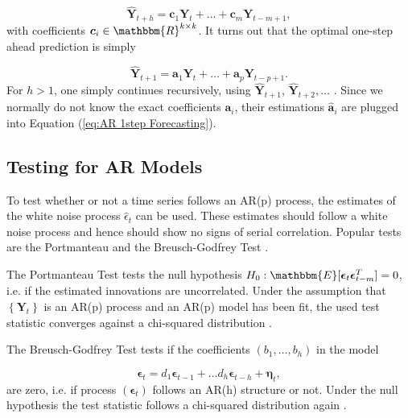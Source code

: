 \begin{equation}
\hat{\bm{Y}}_{t+h} = \bm{c}_1\bm{Y}_{t} + \ldots + \bm{c}_m\bm{Y}_{t-m+1},
\label{eq:Forecasting general}
\end{equation}
%
with coefficients $\bm{c}_i \in \mathbbm{R}^{k \times k}$. It turns out that the optimal one-step ahead prediction is simply \textcite{Scherrer:2021}

\begin{equation}
\hat{\bm{Y}}_{t+1} = \bm{a}_1\bm{Y}_{t} + \ldots + \bm{a}_p\bm{Y}_{t-p+1}.
\label{eq:AR 1step Forecasting}
\end{equation}
%
For $h>1$, one simply continues recursively, using $\hat{\bm{Y}}_{t+1}$, $\hat{\bm{Y}}_{t+2},\ldots$ \textcite{Scherrer:2021}. Since we normally do not know the exact coefficients $\bm{a}_i$, their estimations $\hat{\bm{a}}_i$ are plugged into Equation (\ref{eq:AR 1step Forecasting}). 

\subsection{Testing for AR Models}
\label{sec: Testing for ar models}

To test whether or not a time series follows an AR(p) process, the estimates of the white noise process $\hat{\epsilon}_t$ can be used. These estimates should follow a white noise process and hence should show no signs of serial correlation. Popular tests are the Portmanteau and the Breusch-Godfrey Test \textcite{Scherrer:2021}. 

The Portmanteau Test tests the null hypothesis $H_0: \mathbbm{E}[\bm{\epsilon}_t \bm{\epsilon}_{t-m}^T]=0$, i.e. if the estimated innovations are uncorrelated. Under the assumption that $\left\{\bm{Y}_t\right\}$ is an AR(p) process and an AR(p) model has been fit, the used test statistic converges against a chi-squared distribution \textcite{Scherrer:2021}. 

The Breusch-Godfrey Test tests if the coefficients $(b_1,\ldots,b_h)$ in the model 

\begin{equation}
\bm{\epsilon}_t = d_1\bm{\epsilon}_{t-1} +\ldots d_h \bm{\epsilon}_{t-h} + \bm{\eta}_t,
\label{eq:Breusch-Godfrey Test model}
\end{equation}
%
are zero, i.e. if process $(\bm{\epsilon}_t)$ follows an AR(h) structure or not. Under the null hypothesis the test statistic follows a chi-squared distribution again \textcite{Scherrer:2021}. 

